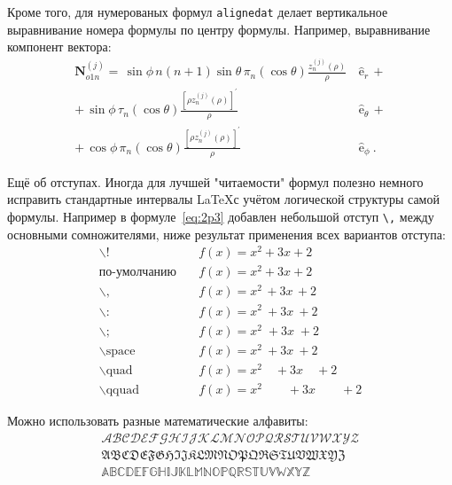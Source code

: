 Кроме того, для  нумерованых формул \verb|alignedat|  делает вертикальное
выравнивание номера формулы по центру формулы. Например,  выравнивание компонент вектора:
\begin{equation}
 \label{eq:2p3}
 \begin{alignedat}{2}
{\mathbf{N}}_{o1n}^{(j)} = \,{\sin} \phi\,n\!\left(n+1\right)
         {\sin}\theta\,
         \pi_n\!\left({\cos} \theta\right)
         \frac{
               z_n^{(j)}\!\left( \rho \right)
              }{\rho}\,
           &{\boldsymbol{\hat{\mathrm e}}}_{r}\,+   \\
+\,
{\sin} \phi\,
         \tau_n\!\left({\cos} \theta\right)
         \frac{
            \left[\rho z_n^{(j)}\!\left( \rho \right)\right]^{\prime}
              }{\rho}\,
            &{\boldsymbol{\hat{\mathrm e}}}_{\theta}\,+   \\
+\,
{\cos} \phi\,
         \pi_n\!\left({\cos} \theta\right)
         \frac{
            \left[\rho z_n^{(j)}\!\left( \rho \right)\right]^{\prime}
              }{\rho}\,
            &{\boldsymbol{\hat{\mathrm e}}}_{\phi}\:.
\end{alignedat}
\end{equation}

Ещё об отступах. Иногда для лучшей "читаемости" формул полезно
немного исправить стандартные интервалы \LaTeX с учётом логической
структуры самой формулы. Например в формуле~\ref{eq:2p3} добавлен
небольшой отступ \verb+\,+ между основными сомножителями, ниже
результат применения всех вариантов отступа:
\begin{align*}
\backslash! &\quad f(x) = x^2\! +3x\! +2 \\
  \mbox{по-умолчанию} &\quad f(x) = x^2+3x+2 \\
\backslash, &\quad f(x) = x^2\, +3x\, +2 \\
\backslash{:} &\quad f(x) = x^2\: +3x\: +2 \\
\backslash; &\quad f(x) = x^2\; +3x\; +2 \\
\backslash \mbox{space} &\quad f(x) = x^2\ +3x\ +2 \\
\backslash \mbox{quad} &\quad f(x) = x^2\quad +3x\quad +2 \\
\backslash \mbox{qquad} &\quad f(x) = x^2\qquad +3x\qquad +2
\end{align*}


Можно использовать разные математические алфавиты:
\begin{align}
\mathcal{ABCDEFGHIJKLMNOPQRSTUVWXYZ} \nonumber \\
\mathfrak{ABCDEFGHIJKLMNOPQRSTUVWXYZ} \nonumber \\
\mathbb{ABCDEFGHIJKLMNOPQRSTUVWXYZ} \nonumber
\end{align}


